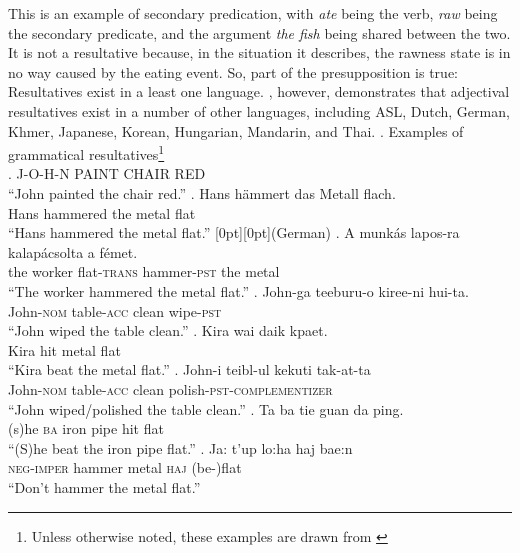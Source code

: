 \documentclass[MilwayThesis]{subfiles}
\begin{document}
This is an example of secondary predication, with \textit{ate} being the verb, \textit{raw} being the secondary predicate, and the argument \textit{the fish} being shared between the two.
It is not a resultative because, in the situation it describes, the rawness state is in no way caused by the eating event.
So, part of the presupposition is true: Resultatives exist in a least one language.
\textcite{snyder1995language,snyder2001nature}, however, demonstrates that adjectival resultatives exist in a number of other languages, including ASL, Dutch, German, Khmer, Japanese, Korean, Hungarian, Mandarin, and Thai.
\ex. Examples of grammatical resultatives\footnote{Unless otherwise noted, these examples are drawn from \textcite{snyder2001nature}}\\
\a. J-O-H-N PAINT CHAIR RED\hfill\parencite[ASL,][]{kentner2018wh}\\
``John painted the chair red.''
\bg. Hans h\"ammert das Metall flach.\\
Hans hammered the metal flat\\
``Hans hammered the metal flat.'' \hfill \raisebox{1.4\baselineskip}[0pt][0pt]{(German)}
\bg. A munk\'as lapos-ra kalap\'acsolta a f\'emet.\\
the worker flat-\textsc{trans} hammer-\textsc{pst} the metal\\
``The worker hammered the metal flat.'' 
\bg. John-ga teeburu-o kiree-ni hui-ta.\\
John-\textsc{nom} table-\textsc{acc} clean wipe-\textsc{pst}\\
``John wiped the table clean.''
\bg. Kira wai daik kpaet.\\
Kira hit metal flat\\
``Kira beat the metal flat.''
\bg. John-i teibl-ul kekuti tak-at-ta\\
John-\textsc{nom} table-\textsc{acc} clean polish-\textsc{pst}-\textsc{complementizer}\\
``John wiped/polished the table clean.''
\bg. Ta ba tie guan da ping.\\
(s)he \textsc{ba} iron pipe hit flat\\
``(S)he beat the iron pipe flat.''
\bg. Ja: t'up lo:ha\textglotstop{} haj bae:n\\
\textsc{neg-imper} hammer metal \textsc{haj} (be-)flat\\
``Don't hammer the metal flat.''
\end{document}
